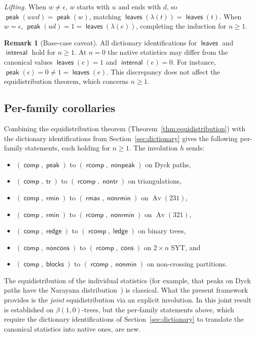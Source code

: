 \documentclass[a4paper,11pt]{article}
\theoremstyle{definition}
\newtheorem{remark}[theorem]{Remark}
\DeclareMathOperator{\comp}{\mathsf{comp}}
\DeclareMathOperator{\rcomp}{\mathsf{rcomp}}
\DeclareMathOperator{\leaves}{\mathsf{leaves}}
\DeclareMathOperator{\internal}{\mathsf{internal}}
\DeclareMathOperator{\peak}{\mathsf{peak}}
\DeclareMathOperator{\nonpeak}{\mathsf{nonpeak}}
\DeclareMathOperator{\tr}{\mathsf{tr}}
\DeclareMathOperator{\nontr}{\mathsf{nontr}}
\DeclareMathOperator{\rmin}{\mathsf{rmin}}
\DeclareMathOperator{\nonrmin}{\mathsf{nonrmin}}
\DeclareMathOperator{\rmax}{\mathsf{rmax}}
\DeclareMathOperator{\redge}{\mathsf{redge}}
\DeclareMathOperator{\ledge}{\mathsf{ledge}}
\DeclareMathOperator{\cons}{\mathsf{cons}}
\DeclareMathOperator{\noncons}{\mathsf{noncons}}
\DeclareMathOperator{\blocks}{\mathsf{blocks}}
\DeclareMathOperator{\nonmin}{\mathsf{nonmin}}
\DeclareMathOperator{\Av}{Av}
\begin{document}
\emph{Lifting.} When $w \neq \epsilon$, $w$ starts
with $u$ and ends with $d$, so
$\peak(uwd) = \peak(w)$, matching
$\leaves(\lambda(t)) = \leaves(t)$.
When $w = \epsilon$,
$\peak(ud) = 1 = \leaves(\lambda(e))$, completing the
induction for $n \geq 1$.

\begin{remark}[Base-case caveat]\label{rem:base-case}
All dictionary identifications for $\leaves$ and
$\internal$ hold for $n \geq 1$. At $n = 0$ the
native statistics may differ from the canonical values
$\leaves(e) = 1$ and $\internal(e) = 0$. For instance,
$\peak(\epsilon) = 0 \neq 1 = \leaves(e)$. This
discrepancy does not affect the equidistribution theorem,
which concerns $n \geq 1$.
\end{remark}

\subsection{Per-family
  corollaries}\label{sec:corollaries}

Combining the equidistribution theorem
(Theorem~\ref{thm:equidistribution}) with the dictionary
identifications from Section~\ref{sec:dictionary} gives the
following per-family
statements, each holding for $n \geq 1$. The involution
$h$ sends:
\begin{itemize}
\item $(\comp, \peak)$ to $(\rcomp, \nonpeak)$ on
  Dyck paths,
\item $(\comp, \tr)$ to $(\rcomp, \nontr)$ on
  triangulations,
\item $(\comp, \rmin)$ to $(\rmax, \nonrmin)$ on
  $\Av(231)$,
\item $(\comp, \rmin)$ to $(\rcomp, \nonrmin)$ on
  $\Av(321)$,
\item $(\comp, \redge)$ to $(\rcomp, \ledge)$ on
  binary trees,
\item $(\comp, \noncons)$ to $(\rcomp, \cons)$ on
  $2 \times n$ SYT, and
\item $(\comp, \blocks)$ to $(\rcomp, \nonmin)$ on
  non-crossing partitions.
\end{itemize}

The equidistribution of the individual statistics (for example, that
peaks on Dyck paths have the Narayana distribution~\cite{Deutsch99,Narayana55})
is classical.  What the present framework provides is the \emph{joint}
equidistribution via an explicit involution.  In \cite{CKS13} this joint result
is established on $\beta(1,0)$-trees, but the per-family statements
above, which require the dictionary identifications of Section~\ref{sec:dictionary}
to translate the canonical statistics into native ones, are new.
\end{document}
